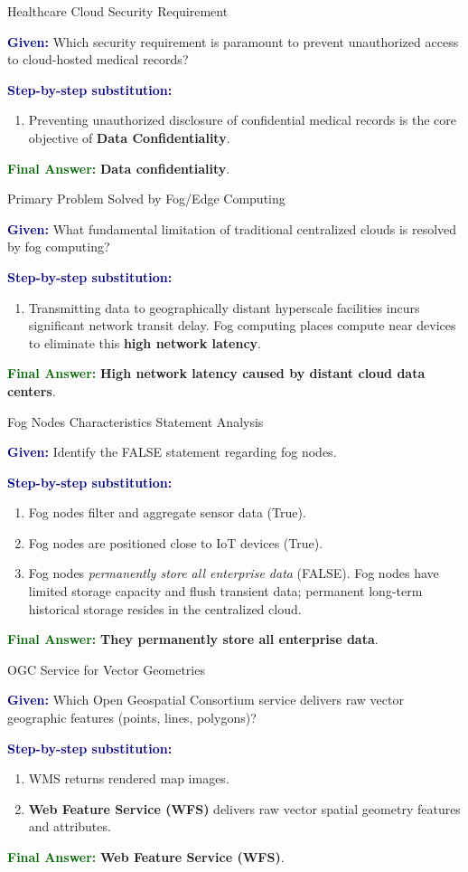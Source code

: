 \documentclass[11pt,a4paper,openany]{report}
\newcommand{\Given}{\par\textbf{\textcolor{navy}{Given:}} }
\newcommand{\Steps}{\par\textbf{\textcolor{navy}{Step-by-step substitution:}}\par}
\newcommand{\Answer}{\par\textbf{\textcolor{darkgreen}{Final Answer:}} }
\begin{document}
\begin{solved}{Healthcare Cloud Security Requirement}
\Given Which security requirement is paramount to prevent unauthorized access to cloud-hosted medical records?
\Steps
\begin{enumerate}[leftmargin=*]
  \item Preventing unauthorized disclosure of confidential medical records is the core objective of \textbf{Data Confidentiality}.
\end{enumerate}
\Answer \textbf{Data confidentiality}.
\end{solved}

\begin{solved}{Primary Problem Solved by Fog/Edge Computing}
\Given What fundamental limitation of traditional centralized clouds is resolved by fog computing?
\Steps
\begin{enumerate}[leftmargin=*]
  \item Transmitting data to geographically distant hyperscale facilities incurs significant network transit delay. Fog computing places compute near devices to eliminate this \textbf{high network latency}.
\end{enumerate}
\Answer \textbf{High network latency caused by distant cloud data centers}.
\end{solved}

\begin{solved}{Fog Nodes Characteristics Statement Analysis}
\Given Identify the FALSE statement regarding fog nodes.
\Steps
\begin{enumerate}[leftmargin=*]
  \item Fog nodes filter and aggregate sensor data (True).
  \item Fog nodes are positioned close to IoT devices (True).
  \item Fog nodes \emph{permanently store all enterprise data} (FALSE). Fog nodes have limited storage capacity and flush transient data; permanent long-term historical storage resides in the centralized cloud.
\end{enumerate}
\Answer \textbf{They permanently store all enterprise data}.
\end{solved}

\begin{solved}{OGC Service for Vector Geometries}
\Given Which Open Geospatial Consortium service delivers raw vector geographic features (points, lines, polygons)?
\Steps
\begin{enumerate}[leftmargin=*]
  \item WMS returns rendered map images.
  \item \textbf{Web Feature Service (WFS)} delivers raw vector spatial geometry features and attributes.
\end{enumerate}
\Answer \textbf{Web Feature Service (WFS)}.
\end{solved}
\end{document}
